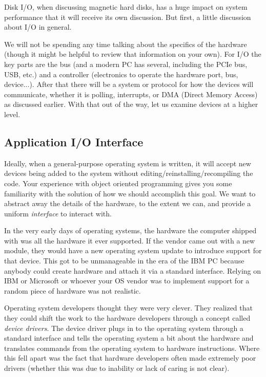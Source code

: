 Disk I/O, when discussing magnetic hard disks, has a huge impact on system performance that it will receive its own discussion. But first, a little discussion about I/O in general.

We will not be spending any time talking about the specifics of the hardware (though it might be helpful to review that information on your own). For I/O the key parts are the bus (and a modern PC has several, including the PCIe bus, USB, etc.) and a controller (electronics to operate the hardware port, bus, device...). After that there will be a system or protocol for how the devices will communicate, whether it is polling, interrupts, or DMA (Direct Memory Access) as discussed earlier. With that out of the way, let us examine devices at a higher level.

\subsection*{Application I/O Interface}

Ideally, when a general-purpose operating system is written, it will accept new devices being added to the system without editing/reinstalling/recompiling the code. Your experience with object oriented programming gives you some familiarity with the solution of how we should accomplish this goal. We want to abstract away the details of the hardware, to the extent we can, and provide a uniform \textit{interface} to interact with. 

In the very early days of operating systems, the hardware the computer shipped with was all the hardware it ever supported. If the vendor came out with a new module, they would have a new operating system update to introduce support for that device. This got to be unmanageable in the era of the IBM PC because anybody could create hardware and attach it via a standard interface. Relying on IBM or Microsoft or whoever your OS vendor was to implement support for a random piece of hardware was not realistic.

Operating system developers thought they were very clever. They realized that they could shift the work to the hardware developers through a concept called \textit{device drivers}. The device driver plugs in to the operating system through a standard interface and tells the operating system a bit about the hardware and translates commands from the operating system to hardware instructions. Where this fell apart was the fact that hardware developers often made extremely poor drivers (whether this was due to inability or lack of caring is not clear).

